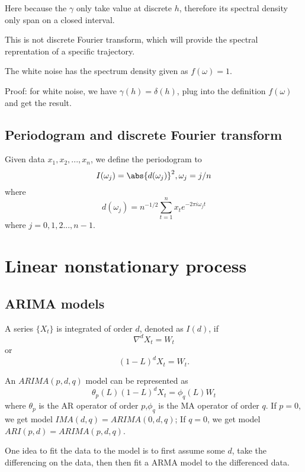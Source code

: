 \begin{remark}
Here because the $\gamma$ only take value at discrete $h$, therefore its spectral density only span on a closed interval. 
\end{remark}

\begin{remark}
This is not discrete Fourier transform, which will provide the spectral reprentation of a specific trajectory. 
\end{remark}

\begin{lemma}
The white noise has the spectrum density given as $f(\omega) = 1$.
\end{lemma}
Proof: for white noise, we have $\gamma(h)=\delta(h)$, plug into the definition $f(\omega)$ and get the result.



\subsection{Periodogram and discrete Fourier transform}
\cite[187]{shumway2010time} Given data $x_1,x_2,...,x_n$, we define the periodogram to $$I(\omega_j) = \abs{d(\omega_j)}^2,\omega_j = j/n$$
where
$$d(\omega_j) = n^{-1/2}\sum_{t=1}^n x_t e^{-2\pi i \omega_j t}$$
where $j=0,1,2...,n-1$.


\section{Linear nonstationary process}
\subsection{ARIMA models}
\begin{definition}
A series $\{X_t\}$ is integrated of order $d$, denoted as $I(d)$, if $$\nabla^d X_t = W_t$$
or 
$$(1-L)^d X_t= W_t.$$
\end{definition}


\begin{definition}[ARIMA]
An $ARIMA(p,d,q)$ model can be represented as
$$\theta_p(L)(1-L)^d X_t = \phi_q(L)W_t$$
where $\theta_p$ is the AR operator of order $p$,$\phi_q$ is the MA operator of order $q$.
If $p=0$, we get model $IMA(d,q) = ARIMA(0,d,q)$; If $q=0$, we get model $ARI(p,d)=ARIMA(p,d,q)$.
\end{definition}

\begin{remark} One idea to fit the data to the model is to first assume some $d$, take the differencing on the data, then then fit a ARMA model to the differenced data.
\end{remark}


